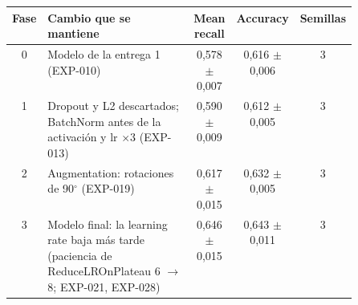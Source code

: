 \begin{tabular}{cp{0.50\linewidth}ccc}
\toprule
Fase & Cambio que se mantiene & Mean recall & Accuracy & Semillas \\
\midrule
0 & Modelo de la entrega 1 (EXP-010) & 0,578 $\pm$ 0,007 & 0,616 $\pm$ 0,006 & 3 \\
1 & Dropout y L2 descartados; BatchNorm antes de la activación y lr $\times$3 (EXP-013) & 0,590 $\pm$ 0,009 & 0,612 $\pm$ 0,005 & 3 \\
2 & Augmentation: rotaciones de 90$^\circ$ (EXP-019) & 0,617 $\pm$ 0,015 & 0,632 $\pm$ 0,005 & 3 \\
3 & Modelo final: la learning rate baja más tarde (paciencia de ReduceLROnPlateau 6 $\rightarrow$ 8; EXP-021, EXP-028) & 0,646 $\pm$ 0,015 & 0,643 $\pm$ 0,011 & 3 \\
\bottomrule
\end{tabular}
